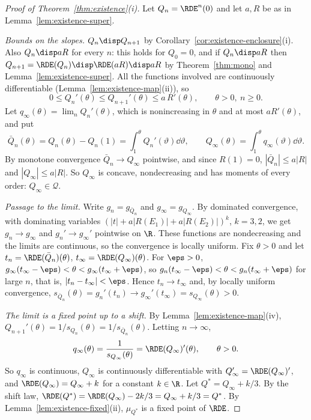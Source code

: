 \begin{proof}[Proof of Theorem~\ref{thm:existence}(i)]
Let $Q_n=\RDE^n(0)$ and let $a,R$ be as in Lemma~\ref{lem:existence-super}.

\emph{Bounds on the slopes.} $Q_n\disp Q_{n+1}$ by
Corollary~\ref{cor:existence-enclosure}(i). Also $Q_n\disp aR$ for every $n$: this holds for
$Q_0=0$, and if $Q_n\disp aR$ then $Q_{n+1}=\RDE(Q_n)\disp\RDE(aR)\disp aR$ by
Theorem~\ref{thm:mono} and Lemma~\ref{lem:existence-super}. All the functions involved are
continuously differentiable (Lemma~\ref{lem:existence-map}(ii)), so
\[
  0\le Q_n'(\theta)\le Q_{n+1}'(\theta)\le a\,R'(\theta),\qquad\theta>0,\ n\ge0 .
\]
Let $q_\infty(\theta)=\lim_nQ_n'(\theta)$, which is nonincreasing in $\theta$ and at most
$aR'(\theta)$, and put
\[
  \bar Q_n(\theta)=Q_n(\theta)-Q_n(1)=\int_1^\theta Q_n'(\vartheta)\dd\vartheta,\qquad
  Q_\infty(\theta)=\int_1^\theta q_\infty(\vartheta)\dd\vartheta .
\]
By monotone convergence $\bar Q_n\to Q_\infty$ pointwise, and since $R(1)=0$,
$|\bar Q_n|\le a|R|$ and $|Q_\infty|\le a|R|$. So $Q_\infty$ is concave, nondecreasing and has
moments of every order: $Q_\infty\in\mathcal{Q}$.

\emph{Passage to the limit.} Write $g_n=g_{\bar Q_n}$ and $g_\infty=g_{Q_\infty}$. By dominated
convergence, with dominating variables $(|t|+a|R(E_1)|+a|R(E_2)|)^k$, $k=3,2$, we get
$g_n\to g_\infty$ and $g_n'\to g_\infty'$ pointwise on $\R$. These functions are nondecreasing
and the limits are continuous, so the convergence is locally uniform. Fix $\theta>0$ and let
$t_n=\RDE(\bar Q_n)(\theta)$, $t_\infty=\RDE(Q_\infty)(\theta)$. For $\eps>0$,
$g_\infty(t_\infty-\eps)<\theta<g_\infty(t_\infty+\eps)$, so
$g_n(t_\infty-\eps)<\theta<g_n(t_\infty+\eps)$ for large $n$, that is, $|t_n-t_\infty|<\eps$.
Hence $t_n\to t_\infty$ and, by locally uniform convergence,
$s_{\bar Q_n}(\theta)=g_n'(t_n)\to g_\infty'(t_\infty)=s_{Q_\infty}(\theta)>0$.

\emph{The limit is a fixed point up to a shift.} By Lemma~\ref{lem:existence-map}(iv),
$Q_{n+1}'(\theta)=1/s_{Q_n}(\theta)=1/s_{\bar Q_n}(\theta)$. Letting $n\to\infty$,
\[
  q_\infty(\theta)=\frac{1}{s_{Q_\infty}(\theta)}=\RDE(Q_\infty)'(\theta),\qquad\theta>0 .
\]
So $q_\infty$ is continuous, $Q_\infty$ is continuously differentiable with
$Q_\infty'=\RDE(Q_\infty)'$, and $\RDE(Q_\infty)=Q_\infty+k$ for a constant $k\in\R$. Let
$Q^*=Q_\infty+k/3$. By the shift law, $\RDE(Q^*)=\RDE(Q_\infty)-2k/3=Q_\infty+k/3=Q^*$. By
Lemma~\ref{lem:existence-fixed}(ii), $\mu_{Q^*}$ is a fixed point of $\RDE$.
\end{proof}

